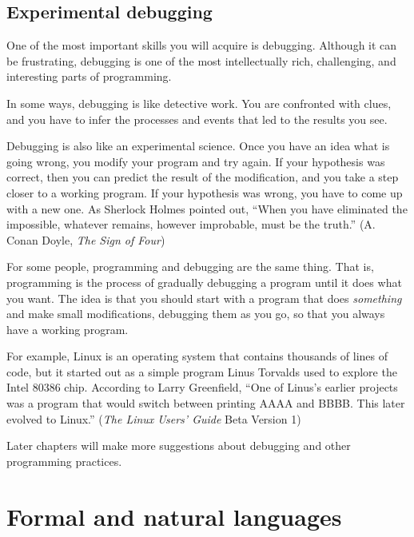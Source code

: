 \subsection{Experimental debugging}

One of the most important skills you will acquire is
debugging.  Although it can be frustrating, debugging is one of the
most intellectually rich, challenging, and interesting parts of programming.

In some ways, debugging is like detective work.  You are confronted
with clues, and you have to infer the processes and events that led
to the results you see.

Debugging is also like an experimental science.  Once you have an idea
what is going wrong, you modify your program and try again.  If your
hypothesis was correct, then you can predict the result of the
modification, and you take a step closer to a working program.  If
your hypothesis was wrong, you have to come up with a new one.  As
Sherlock Holmes pointed out, ``When you have eliminated the
impossible, whatever remains, however improbable, must be the truth.''
(A. Conan Doyle, {\em The Sign of Four})


For some people, programming and debugging are the
same thing.  That is, programming is the process of gradually
debugging a program until it does what you want.  The idea
is that you should start with a program that
does {\em something} and make small modifications, debugging
them as you go, so that you always have a working program.

For example, Linux is an operating system that contains thousands of
lines of code, but it started out as a simple program Linus Torvalds
used to explore the Intel 80386 chip.  According to Larry Greenfield,
``One of Linus's earlier projects was a program that would switch
between printing AAAA and BBBB.  This later evolved to Linux.''
({\em The Linux Users' Guide} Beta Version 1)


Later chapters will make more suggestions about debugging and other
programming practices.

\section{Formal and natural languages}

